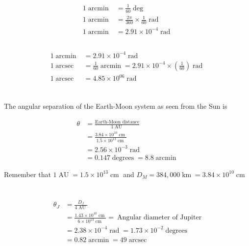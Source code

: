 \documentclass[11pt]{scrartcl}
\DeclareMathOperator{\AU}{AU}
\DeclareMathOperator{\arcsec}{arcsec}
\DeclareMathOperator{\km}{km}
\DeclareMathOperator{\cm}{cm}
\DeclareMathOperator{\rad}{rad}
\DeclareMathOperator{\degrees}{degrees}
\DeclareMathOperator{\arcmin}{arcmin}
\newcommand\pow[2]{\ensuremath{#1 \times 10^{#2}}}
\begin{document}
\subsection{}

\begin{align*}
1 \arcmin &= \frac{1}{60}\deg \\
1 \arcmin &= \frac{2\pi}{360} \times \frac{1}{60} \rad \\
1 \arcmin &= \pow{2.91}{-4}\rad
\end{align*}

\subsection{}

\begin{align*}
1 \arcmin &= \pow{2.91}{-4}\rad \\
1 \arcsec &= \frac{1}{60}\arcmin = \pow{2.91}{-4} \times \left(\frac{1}{60}\right) \rad \\
1 \arcsec &= \pow{4.85}{06}\rad
\end{align*}


\section{}

The angular separation of the Earth-Moon system as seen from the Sun is

\begin{align*}
\theta &=\frac{\text{Earth-Moon distance}}{1\AU} \\
&= \frac{\pow{3.84}{10}\cm}{\pow{1.5}{13}\cm} \\
&= \pow{2.56}{-3}\rad \\
&= 0.147 \degrees = 8.8\arcmin
\end{align*}

Remember that $1\AU = \pow{1.5}{13}\cm$ and $D_M = 384,000\km = \pow{3.84}{10}\cm$


\section{}

\subsection{}

\begin{align*}
\theta_J &= \frac{D_J}{4\AU} \\
&= \frac{\pow{1.43}{10}\cm}{\pow{6}{13}\cm} = \ \text{Angular diameter of Jupiter} \\
&= \pow{2.38}{-4}\rad = \pow{1.73}{-2}\degrees \\
&= 0.82 \arcmin = 49\arcsec
\end{align*}
\end{document}

